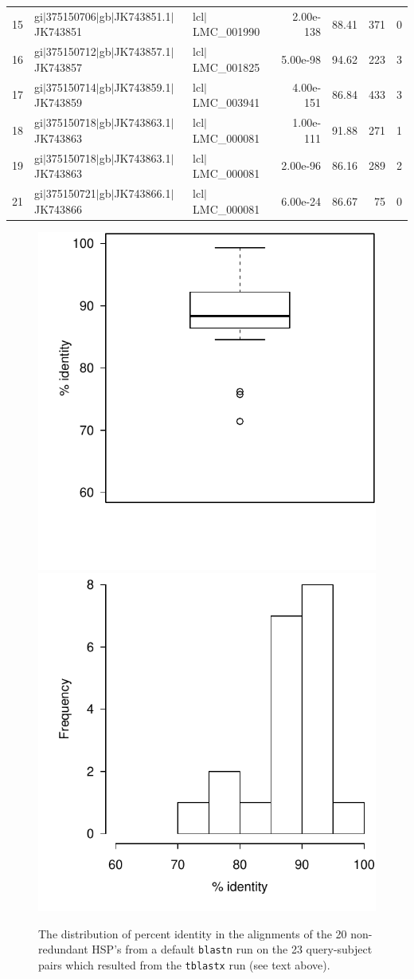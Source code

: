 \documentclass{article}\usepackage[]{graphicx}\usepackage[]{color}
\newenvironment{knitrout}{}{} %
\begin{document}
\begin{table}[ht]
\begin{tabular}{rllrrrr}
  15 & gi$|$375150706$|$gb$|$JK743851.1$|$JK743851 & lcl$|$LMC\_001990 & 2.00e-138 & 88.41 & 371 &   0 \\ 
  16 & gi$|$375150712$|$gb$|$JK743857.1$|$JK743857 & lcl$|$LMC\_001825 & 5.00e-98 & 94.62 & 223 &   3 \\ 
  17 & gi$|$375150714$|$gb$|$JK743859.1$|$JK743859 & lcl$|$LMC\_003941 & 4.00e-151 & 86.84 & 433 &   3 \\ 
  18 & gi$|$375150718$|$gb$|$JK743863.1$|$JK743863 & lcl$|$LMC\_000081 & 1.00e-111 & 91.88 & 271 &   1 \\ 
  19 & gi$|$375150718$|$gb$|$JK743863.1$|$JK743863 & lcl$|$LMC\_000081 & 2.00e-96 & 86.16 & 289 &   2 \\ 
  21 & gi$|$375150721$|$gb$|$JK743866.1$|$JK743866 & lcl$|$LMC\_000081 & 6.00e-24 & 86.67 &  75 &   0 \\ 
   \hline
\end{tabular}
\end{table}


\begin{figure}
\begin{knitrout}
\color{fgcolor}

{\centering \includegraphics[width=.4\linewidth]{figure/pident_fig1} 
\includegraphics[width=.4\linewidth]{figure/pident_fig2} 

}



\end{knitrout}
\caption{The distribution of percent identity in the alignments of the 20 non-redundant HSP's from a default \texttt{blastn} run on the 23 query-subject pairs which resulted from the \texttt{tblastx} run (see text above).}
\end{figure}
\end{document}
